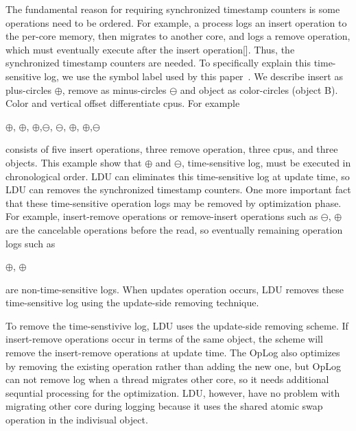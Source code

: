 The fundamental reason for requiring synchronized timestamp counters is some
operations need to be ordered.
For example, a process logs an insert operation to the per-core memory, then
migrates to another core, and logs a remove operation, which must eventually
execute after the insert operation[].
Thus, the synchronized timestamp counters are needed.
To specifically explain this time-sensitive log, we use the symbol label used by
this paper~\cite{Clements15SCR}.
We describe insert as plus-circles $\oplus$, remove as minus-circles
$\ominus$ and object as color-circles (object B). 
Color and vertical offset differentiate cpus.
For example
\begin{center}
$\oplus$, $\oplus$, $\oplus$,$\ominus$,
$\ominus$, $\oplus$, $\oplus$,$\ominus$
\end{center}
consists of five insert operations, three remove operation, three cpus, and
three objects.
This example show that $\oplus$ and $\ominus$,
time-sensitive log, must be executed in chronological order.
LDU can eliminates this time-sensitive log at update time, so LDU can removes
the synchronized timestamp counters.
One more important fact that these time-sensitive operation logs may be removed
by optimization phase.
For example, insert-remove operations or remove-insert operations such as 
$\ominus$, $\oplus$ are the cancelable operations before
the read, so eventually remaining operation logs such as
\begin{center}
 $\oplus$, $\oplus$
\end{center}
are non-time-sensitive logs.
When updates operation occurs, LDU removes these time-sensitive log using
the update-side removing technique.


To remove the time-senstivive log, LDU uses the update-side removing scheme.
If insert-remove operations occur in terms of the same object, the scheme will
remove the insert-remove operations at update time.
The OpLog also optimizes by removing the existing operation rather than
adding the new one, but OpLog can not remove log when a thread 
migrates other core, so it needs additional sequntial processing for
the optimization.
LDU, however, have no problem with migrating other core during logging because
it uses the shared atomic swap operation in the indivisual object.


